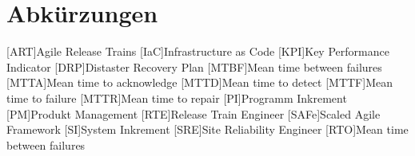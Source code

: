 \chapter*{Abkürzungen}

\begin{acronym}        
    [ART]{Agile Release Trains}
    [IaC]{Infrastructure as Code}
    [KPI]{Key Performance Indicator}
    [DRP]{Distaster Recovery Plan}
    [MTBF]{Mean time between failures}
    [MTTA]{Mean time to acknowledge}
    [MTTD]{Mean time to detect}
    [MTTF]{Mean time to failure}
    [MTTR]{Mean time to repair}  
    [PI]{Programm Inkrement}
    [PM]{Produkt Management}
    [RTE]{Release Train Engineer}
    [SAFe]{Scaled Agile Framework}
    [SI]{System Inkrement}
    [SRE]{Site Reliability Engineer}    
    [RTO]{Mean time between failures}
\end{acronym}
